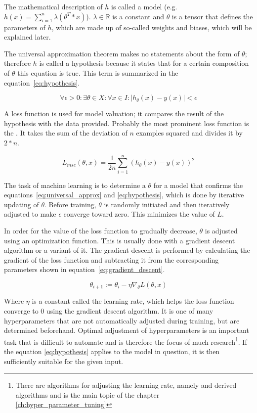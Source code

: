The mathematical description of $h$ is called a model (e.g. $h(x) = \sum_{i=1}^n{\lambda (\theta^T * x)}$).
$\lambda \in \mathbb{R}$ is a constant and $\theta$ is a tensor that defines the parameters of $h$, which are made up of so-called weights and biases, which will be explained later.

The universal approximation theorem makes no statements about the form of $\theta$; therefore $h$ is called a hypothesis because it states that for a certain composition of $\theta$ this equation is true.
This term is summarized in the equation~\eqref{eq:hypothesis}.

\begin{equation}
    \forall \epsilon > 0 : \exists \theta \in X : \forall x \in I : |
    h_\theta(x) - y(x) | < \epsilon
    \label{eq:hypothesis}
\end{equation}

A loss function is used for model valuation; it compares the result of the hypothesis with the data provided.
Probably the most prominent loss function is the .
It takes the sum of the deviation of $n$ examples squared and divides it by $2*n$.

\begin{equation}
    L_{mse}(\theta, x) = \frac{1}{2 n} \sum_{i=1}^n (h_\theta(x) - y(x))^2
    \label{eq:mse}
\end{equation} 

The task of machine learning is to determine a $\theta$ for a model that confirms the equations~\ref{eq:universal_approx} and \ref{eq:hypothesis}, which is done by iterative updating of $\theta$. 
Before training, $\theta$ is randomly initiated and then iteratively adjusted to make $\epsilon$ converge toward zero. This minimizes the value of $L$.

In order for the value of the loss function to gradually decrease, $\theta$ is adjusted using an optimization function.
This is usually done with a gradient descent algorithm or a variant of it.
The gradient descent is performed by calculating the gradient of the loss function and subtracting it from the corresponding parameters shown in equation~\eqref{eq:gradient_descent}.

\begin{equation}
    \theta_{i+1} := \theta_i - \eta \nabla_\theta L(\theta, x)
    \label{eq:gradient_descent}
\end{equation}

Where $\eta$ is a constant called the learning rate, which helps the loss function converge to 0 using the gradient descent algorithm.
It is one of many hyperparameters that are not automatically adjusted during training, but are determined beforehand.
Optimal adjustment of hyperparameters is an important task that is difficult to automate and is therefore the focus of much research\footnote{There are algorithms for adjusting the learning rate, namely  \cite{Duchi2010} and derived algorithms and is the main topic of the chapter \ref{ch:hyper_parameter_tuning}}.
If the equation \eqref{eq:hypothesis} applies to the model in question, it is then sufficiently suitable for the given input.

